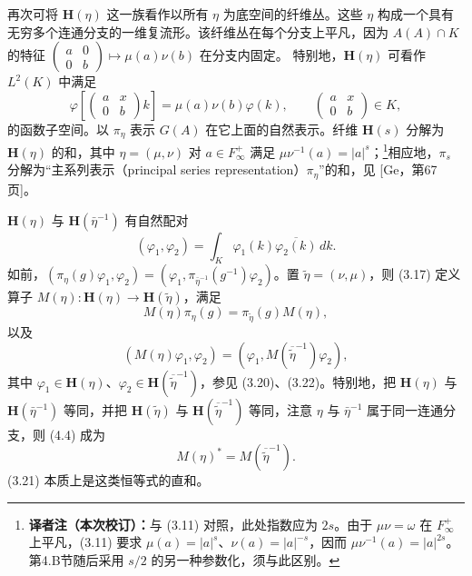 再次可将 $\mathbf H(\eta)$ 这一族看作以所有 $\eta$ 为底空间的纤维丛。这些 $\eta$ 构成一个具有无穷多个连通分支的一维复流形。该纤维丛在每个分支上平凡，因为
$A(A)\cap K$ 的特征
$\left(\begin{smallmatrix}a&0\\0&b\end{smallmatrix}\right)\mapsto\mu(a)\nu(b)$ 在分支内固定。
特别地，$\mathbf H(\eta)$ 可看作 $L^2(K)$ 中满足
\[
 \varphi\!\left[\begin{pmatrix}a&x\\0&b\end{pmatrix}k\right]
 =\mu(a)\nu(b)\varphi(k),\qquad
 \begin{pmatrix}a&x\\0&b\end{pmatrix}\in K,
\]
的函数子空间。以 $\pi_\eta$ 表示 $G(A)$ 在它上面的自然表示。纤维 $\mathbf H(s)$ 分解为
$\mathbf H(\eta)$ 的和，其中 $\eta=(\mu,\nu)$ 对 $a\in F_\infty^+$ 满足
$\mu\nu^{-1}(a)=|a|^s$；\footnote{\textbf{译者注（本次校订）：}与 (3.11) 对照，此处指数应为 $2s$。由于 $\mu\nu=\omega$ 在 $F_\infty^+$ 上平凡，(3.11) 要求 $\mu(a)=|a|^s$、$\nu(a)=|a|^{-s}$，因而 $\mu\nu^{-1}(a)=|a|^{2s}$。第4.B节随后采用 $s/2$ 的另一种参数化，须与此区别。}相应地，$\pi_s$ 分解为“主系列表示（principal series representation）$\pi_\eta$”的和，见 [Ge，第67页]。

$\mathbf H(\eta)$ 与 $\mathbf H(\bar\eta^{-1})$ 有自然配对
\[
 (\varphi_1,\varphi_2)=\int_K\varphi_1(k)\overline{\varphi_2(k)}\,dk.
\]
如前，$(\pi_\eta(g)\varphi_1,\varphi_2)
=(\varphi_1,\pi_{\bar\eta^{-1}}(g^{-1})\varphi_2)$。置 $\widetilde\eta=(\nu,\mu)$，则 (3.17) 定义算子
$M(\eta):\mathbf H(\eta)\to\mathbf H(\widetilde\eta)$，满足
\begin{equation}
 M(\eta)\pi_\eta(g)=\pi_{\widetilde\eta}(g)M(\eta),\tag{4.3}
\end{equation}
以及
\begin{equation}
 (M(\eta)\varphi_1,\varphi_2)
 =(\varphi_1,M(\overline{\widetilde\eta}^{-1})\varphi_2),\tag{4.4}
\end{equation}
其中 $\varphi_1\in\mathbf H(\eta)$、$\varphi_2\in\mathbf H(\overline{\widetilde\eta}^{-1})$，参见
(3.20)、(3.22)。特别地，把 $\mathbf H(\eta)$ 与 $\mathbf H(\bar\eta^{-1})$ 等同，并把
$\mathbf H(\widetilde\eta)$ 与 $\mathbf H(\overline{\widetilde\eta}^{-1})$ 等同，注意
$\eta$ 与 $\bar\eta^{-1}$ 属于同一连通分支，则 (4.4) 成为
\begin{equation}
 M(\eta)^*=M(\overline{\widetilde\eta}^{-1}).\tag{4.5}
\end{equation}
(3.21) 本质上是这类恒等式的直和。

